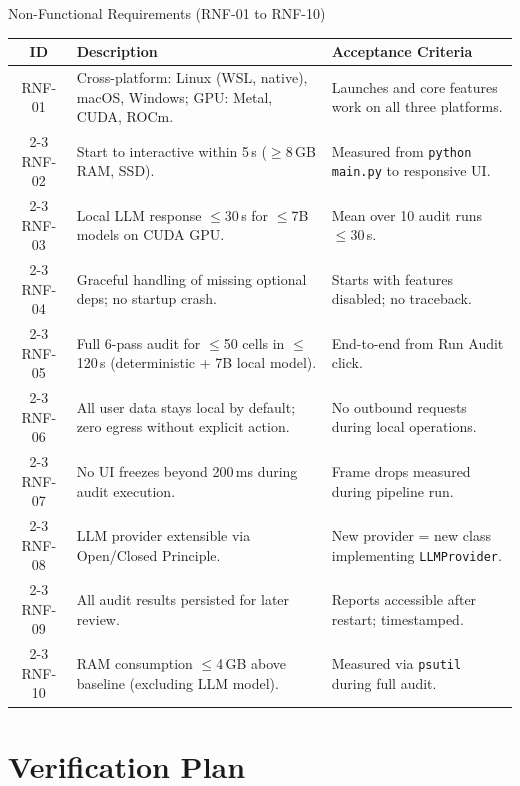 \documentclass[aspectratio=169,11pt]{beamer}
\begin{document}
\begin{frame}[shrink]{Non-Functional Requirements (RNF-01 to RNF-10)}
  \centering
  \scriptsize
  \renewcommand{\arraystretch}{0.85}
  \begin{tabularx}{\textwidth}{c X p{4.5cm}}
    \toprule
    \textbf{ID} & \textbf{Description} & \textbf{Acceptance Criteria} \\
    \midrule
    RNF-01 & Cross-platform: Linux (WSL, native), macOS, Windows; GPU: Metal, CUDA, ROCm. & Launches and core features work on all three platforms. \\
    \cmidrule{2-3}
    RNF-02 & Start to interactive within 5\,s ($\geq$8\,GB RAM, SSD). & Measured from \texttt{python main.py} to responsive UI. \\
    \cmidrule{2-3}
    RNF-03 & Local LLM response $\leq$30\,s for $\leq$7B models on CUDA GPU. & Mean over 10 audit runs $\leq$30\,s. \\
    \cmidrule{2-3}
    RNF-04 & Graceful handling of missing optional deps; no startup crash. & Starts with features disabled; no traceback. \\
    \cmidrule{2-3}
    RNF-05 & Full 6-pass audit for $\leq$50 cells in $\leq$120\,s (deterministic + 7B local model). & End-to-end from Run Audit click. \\
    \cmidrule{2-3}
    RNF-06 & All user data stays local by default; zero egress without explicit action. & No outbound requests during local operations. \\
    \cmidrule{2-3}
    RNF-07 & No UI freezes beyond 200\,ms during audit execution. & Frame drops measured during pipeline run. \\
    \cmidrule{2-3}
    RNF-08 & LLM provider extensible via Open/Closed Principle. & New provider = new class implementing \texttt{LLMProvider}. \\
    \cmidrule{2-3}
    RNF-09 & All audit results persisted for later review. & Reports accessible after restart; timestamped. \\
    \cmidrule{2-3}
    RNF-10 & RAM consumption $\leq$4\,GB above baseline (excluding LLM model). & Measured via \texttt{psutil} during full audit. \\
    \bottomrule
  \end{tabularx}
\end{frame}

\section{Verification Plan}
\end{document}
